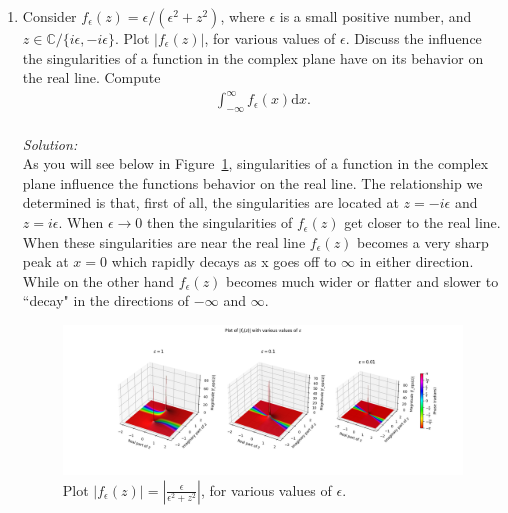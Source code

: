 \documentclass[10pt]{amsart}
\newcommand{\D}{\mathrm{d}}
\theoremstyle{nonumberplain}
\begin{document}
\begin{enumerate}[label={\bf {\arabic*}:}]
\item Consider $f_\epsilon(z)=\epsilon /\left(\epsilon^2+z^2\right)$, where
  $\epsilon$ is a small positive number, and $z \in \mathbb{C} /\{i
  \epsilon,-i \epsilon\}$. Plot $\left|f_\epsilon(z)\right|$, for various
  values of $\epsilon$. Discuss the influence the singularities of a
  function in the complex plane have on its behavior on the real
  line. Compute
  \begin{align*}
    \int_{-\infty}^\infty f_\epsilon(x) \D x.
  \end{align*} \\
\textit{Solution:} \\
As you will see below in Figure~\ref{fig:f1}, singularities of a function in the complex plane influence the functions behavior on the real line. The relationship we determined is that, first of all, the singularities are located at $z = -i\epsilon$ and $z = i\epsilon$. When $\epsilon \rightarrow 0$ then the singularities of $f_\epsilon(z)$ get closer to the real line. When these singularities are near the real line $f_{\epsilon}(z)$ becomes a very sharp peak at $x=0$ which rapidly decays as x goes off to $\infty$ in either direction. While on the other hand $f_\epsilon(z)$ becomes much wider or flatter and slower to ``decay" in the directions of $-\infty$ and $\infty$.
\\
\begin{figure}[h]
	\centering
	\includegraphics[width=1\textwidth]{f_sub_epsilon_vis.png}
 	\caption{Plot $\left|f_\epsilon(z)\right| = \left| \frac{\epsilon}{\epsilon^2+z^2}\right|$, for various values of $\epsilon$.}\label{fig:f1}
\end{figure}


\end{enumerate}
\end{document}
